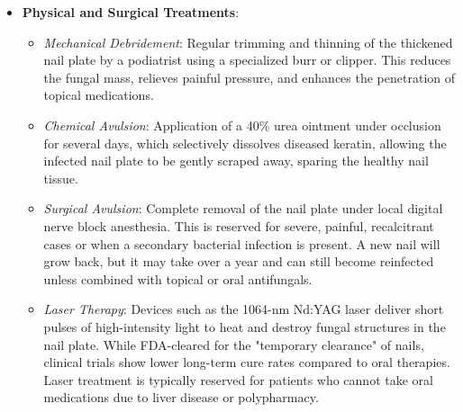 \begin{itemize}
\begin{itemize}
        \item \textit{Itraconazole}: Can be prescribed as continuous therapy (200 mg daily for 12 weeks) or pulse therapy (400 mg daily in two divided doses for 1 week, followed by 3 weeks off). Two pulses are used for fingernails and three to four pulses for toenails. Itraconazole is fungistatic. It requires monitoring of LFTs and is contraindicated in patients with a history of heart failure or ventricular dysfunction due to its negative inotropic effects. It also has a wide profile of drug-drug interactions via the CYP3A4 pathway.
        \item \textit{Fluconazole}: An alternative oral agent, taken at a dose of 150 mg to 300 mg once weekly for 6 to 12 months. It is used off-label when terbinafine and itraconazole are not tolerated or are contraindicated.
    \end{itemize}
    \item \textbf{Physical and Surgical Treatments}:
    \begin{itemize}
        \item \textit{Mechanical Debridement}: Regular trimming and thinning of the thickened nail plate by a podiatrist using a specialized burr or clipper. This reduces the fungal mass, relieves painful pressure, and enhances the penetration of topical medications.
        \item \textit{Chemical Avulsion}: Application of a 40\% urea ointment under occlusion for several days, which selectively dissolves diseased keratin, allowing the infected nail plate to be gently scraped away, sparing the healthy nail tissue.
        \item \textit{Surgical Avulsion}: Complete removal of the nail plate under local digital nerve block anesthesia. This is reserved for severe, painful, recalcitrant cases or when a secondary bacterial infection is present. A new nail will grow back, but it may take over a year and can still become reinfected unless combined with topical or oral antifungals.
        \item \textit{Laser Therapy}: Devices such as the 1064-nm Nd:YAG laser deliver short pulses of high-intensity light to heat and destroy fungal structures in the nail plate. While FDA-cleared for the "temporary clearance" of nails, clinical trials show lower long-term cure rates compared to oral therapies. Laser treatment is typically reserved for patients who cannot take oral medications due to liver disease or polypharmacy.
    \end{itemize}
\end{itemize}

